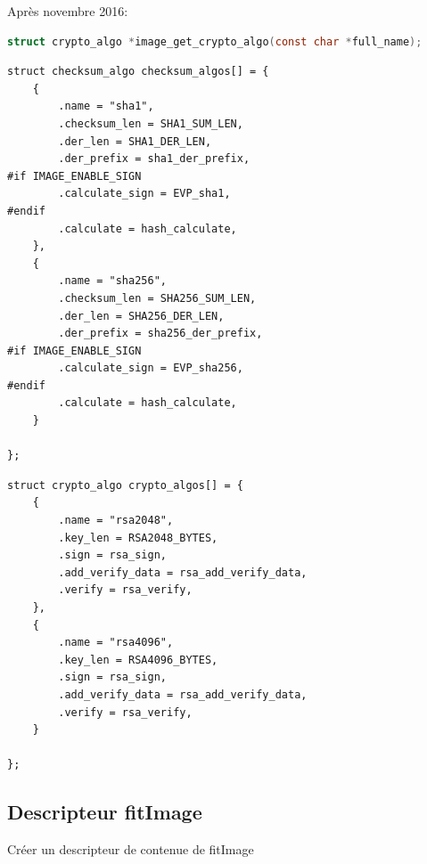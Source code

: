 \documentclass[aspectratio=169]{beamer}
\begin{document}
\begin{frame}[fragile]
Après novembre 2016:

\begin{lstlisting}[language=C,basicstyle=\tiny\ttfamily\color{white}]
struct crypto_algo *image_get_crypto_algo(const char *full_name);
\end{lstlisting}
{\setlength\multicolsep{0pt}
\begin{multicols}{2}
\begin{lstlisting}[style=shell,basicstyle=\tiny\ttfamily\color{white}]
struct checksum_algo checksum_algos[] = {
	{
		.name = "sha1",
		.checksum_len = SHA1_SUM_LEN,
		.der_len = SHA1_DER_LEN,
		.der_prefix = sha1_der_prefix,
#if IMAGE_ENABLE_SIGN
		.calculate_sign = EVP_sha1,
#endif
		.calculate = hash_calculate,
	},
	{
		.name = "sha256",
		.checksum_len = SHA256_SUM_LEN,
		.der_len = SHA256_DER_LEN,
		.der_prefix = sha256_der_prefix,
#if IMAGE_ENABLE_SIGN
		.calculate_sign = EVP_sha256,
#endif
		.calculate = hash_calculate,
	}

};
\end{lstlisting}
\columnbreak
\begin{lstlisting}[style=shell,basicstyle=\tiny\ttfamily\color{white}]
struct crypto_algo crypto_algos[] = {
	{
		.name = "rsa2048",
		.key_len = RSA2048_BYTES,
		.sign = rsa_sign,
		.add_verify_data = rsa_add_verify_data,
		.verify = rsa_verify,
	},
	{
		.name = "rsa4096",
		.key_len = RSA4096_BYTES,
		.sign = rsa_sign,
		.add_verify_data = rsa_add_verify_data,
		.verify = rsa_verify,
	}

};
\end{lstlisting}
\end{multicols}
}
\end{frame}


\subsection{Descripteur fitImage}

\begin{frame}
\begin{center}
\large{Créer un descripteur de contenue de fitImage}
\end{center}
\end{frame}
\end{document}
